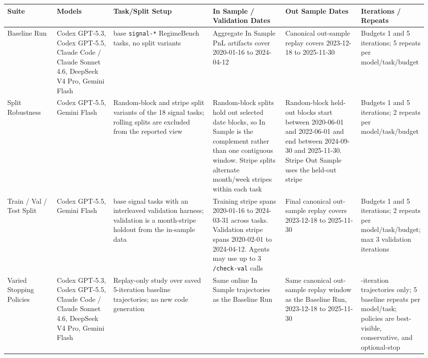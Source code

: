 \documentclass[
]{article}
\begin{document}
\begin{longtable}[]{@{}>{\raggedright\arraybackslash}p{0.12\linewidth}>{\raggedright\arraybackslash}p{0.14\linewidth}>{\raggedright\arraybackslash}p{0.25\linewidth}>{\raggedright\arraybackslash}p{0.18\linewidth}>{\raggedright\arraybackslash}p{0.19\linewidth}>{\raggedright\arraybackslash}p{0.12\linewidth}@{}}
\toprule\noalign{}
Suite & Models & Task/Split Setup & In Sample / Validation Dates & Out Sample Dates & Iterations / Repeats \\
\midrule\noalign{}
\endhead
\bottomrule\noalign{}
\endlastfoot
Baseline Run & Codex GPT-5.3, Codex GPT-5.5, Claude Code / Claude Sonnet 4.6, DeepSeek V4 Pro, Gemini Flash & 18 base \texttt{signal-*} RegimeBench tasks, no split variants & Aggregate In Sample PnL artifacts cover 2020-01-16 to 2024-04-12 & Canonical out-sample replay covers 2023-12-18 to 2025-11-30 & Budgets 1 and 5 iterations; 5 repeats per model/task/budget \\
Split Robustness & Codex GPT-5.5, Gemini Flash & Random-block and stripe split variants of the 18 signal tasks; rolling splits are excluded from the reported view & Random-block splits hold out selected date blocks, so In Sample is the complement rather than one contiguous window. Stripe splits alternate month/week stripes within each task & Random-block held-out blocks start between 2020-06-01 and 2022-06-01 and end between 2024-09-30 and 2025-11-30. Stripe Out Sample uses the held-out stripe & Budgets 1 and 5 iterations; 2 repeats per model/task/budget \\
Train / Val / Test Split & Codex GPT-5.5, Gemini Flash & 18 base signal tasks with an interleaved validation harness; validation is a month-stripe holdout from the in-sample data & Training stripe spans 2020-01-16 to 2024-03-31 across tasks. Validation stripe spans 2020-02-01 to 2024-04-12. Agents may use up to 3 \texttt{/check-val} calls & Final canonical out-sample replay covers 2023-12-18 to 2025-11-30 & Budgets 1 and 5 iterations; 2 repeats per model/task/budget; max 3 validation iterations \\
Varied Stopping Policies & Codex GPT-5.3, Codex GPT-5.5, Claude Code / Claude Sonnet 4.6, DeepSeek V4 Pro, Gemini Flash & Replay-only study over saved 5-iteration baseline trajectories; no new code generation & Same online In Sample trajectories as the Baseline Run & Same canonical out-sample replay window as the Baseline Run, 2023-12-18 to 2025-11-30 & 5-iteration trajectories only; 5 baseline repeats per model/task; policies are best-visible, conservative, and optional-stop \\
\end{longtable}
\end{document}
